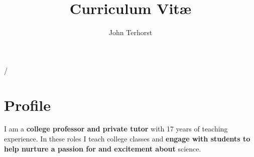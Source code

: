 \documentclass[11pt]{article}
\author{John Terhorst}
\title{Curriculum Vit\ae}
\makeatletter
\def\mycolor{myRed}%
\def\position{Adjunct Assistant Professor of Chemistry}
\def\currempl{Vanguard University of Southern California}
\def\address{55 Fair Drive, Costa Mesa, California 92626}
\def\dept{Dept.\ of Environmental and Chemical Sciences}
\renewcommand{\maketitle}{
			{\vspace*{0.15cm}\huge{\color{\mycolor}\hspace*{1.0mm}\textbf{\theauthor}} / \hspace{-0.5mm}\thetitle}

			\position\ / \dept \\
			\currempl\ / \address

			\vspace*{0pt}
			}
\def\address{26 Kendall Avenue, Redlands, California 92373}
\def\phone{562.458.8254}
\def\mymail{\email{john@johnterhorst.com}}
\renewcommand{\maketitle}{
			{\vspace*{0.15cm}\huge{\color{\mycolor}\hspace*{1.0mm}\textbf{\theauthor}} / \hspace{-0.5mm}\thetitle}

			\position\ / \currempl \\
			\address\ / \phone\ / \mymail 

			\vspace*{0pt}
			}
\renewcommand{\maketitle}{
			{\huge{\color{\mycolor}\textbf{\theauthor}} / \hspace{-0.5mm}\thetitle}
			\vspace*{12pt}
			}
\newcommand{\email}[1]{\href{mailto:#1}{#1}}
\newcommand{\paritem}[2]{\textbf{#1} #2}
\makeatother
\begin{document}

\maketitle


\section{Profile}


I am a \textbf{college professor and private tutor} with 17 years of teaching experience. In these roles I teach college classes and \textbf{engage with students to help nurture a passion for and excitement about} science. 

\begin{comment}

\paritem{Research} {in Monte Carlo statistical perturbation theory for computing free-energy binding affinities using implicit solvent models, including software design and implementation.} 

\paritem{Development} {of molecular mechanics force fields including explicit treatment of polarization effects for use in computer-aided drug design of therapeutic agents targeting infectious, inflammatory, and hyperproliferative diseases.} 

\paritem{Seventeen years experience in instruction} {of chemistry, including organic chemistry and spectroscopy lecture and lab courses, as a teaching assistant, private tutor, graduate teaching fellow, and university professor.}

\end{comment}
\end{document}
